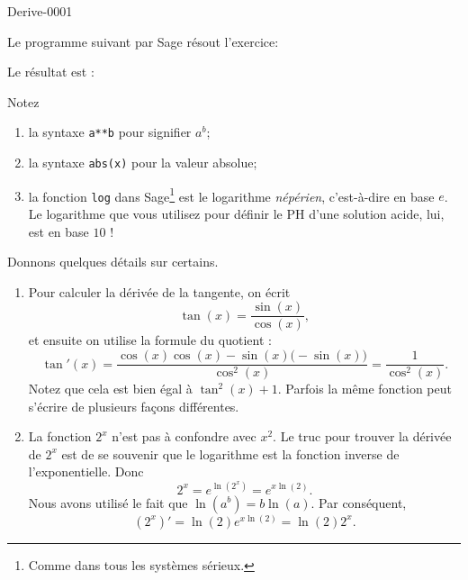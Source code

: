 
\begin{corrige}{Derive-0001}

Le programme suivant par Sage résout l'exercice:


Le résultat est :

Notez
\begin{enumerate}
	\item
		la syntaxe \verb+a**b+ pour signifier $a^b$;
	\item
		la syntaxe \verb+abs(x)+ pour la valeur absolue;
	\item
		la fonction \verb+log+ dans Sage\footnote{Comme dans tous les systèmes sérieux.} est le logarithme \emph{népérien}, c'est-à-dire en base $e$. Le logarithme que vous utilisez pour définir le PH d'une solution acide, lui, est en base $10$ !
\end{enumerate}

Donnons quelques détails sur certains.
\begin{enumerate}
	\item
		Pour calculer la dérivée de la tangente, on écrit
		\begin{equation}
			\tan(x)=\frac{ \sin(x) }{ \cos(x) },
		\end{equation}
		et ensuite on utilise la formule du quotient :
		\begin{equation}
			\tan'(x)=\frac{ \cos(x)\cos(x)-\sin(x)\big( -\sin(x) \big) }{ \cos^2(x) }=\frac{1}{ \cos^2(x) }.
		\end{equation}
		Notez que cela est bien égal à $\tan^2(x)+1$. Parfois la même fonction peut s'écrire de plusieurs façons différentes.
	\item
		La fonction $2^x$ n'est pas à confondre avec $x^2$. Le truc pour trouver la dérivée de $2^x$ est de se souvenir que le logarithme est la fonction inverse de l'exponentielle. Donc
		\begin{equation}
			2^x= e^{\ln(2^x)}= e^{x\ln(2)}.
		\end{equation}
		Nous avons utilisé le fait que $\ln(a^b)=b\ln(a)$. Par conséquent,
		\begin{equation}
			(2^x)'=\ln(2) e^{x\ln(2)}=\ln(2)2^{x}.
		\end{equation}
		

\end{enumerate}
\end{corrige}
